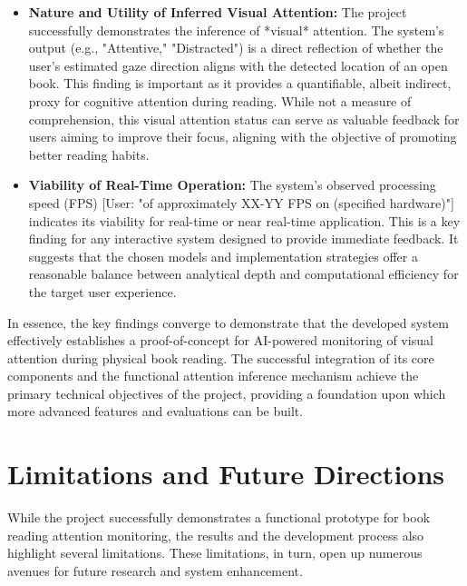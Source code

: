 \begin{itemize}
    \item \textbf{Nature and Utility of Inferred Visual Attention:}
    The project successfully demonstrates the inference of *visual* attention. The system's output (e.g., "Attentive," "Distracted") is a direct reflection of whether the user's estimated gaze direction aligns with the detected location of an open book. This finding is important as it provides a quantifiable, albeit indirect, proxy for cognitive attention during reading. While not a measure of comprehension, this visual attention status can serve as valuable feedback for users aiming to improve their focus, aligning with the objective of promoting better reading habits.

    \item \textbf{Viability of Real-Time Operation:}
    The system's observed processing speed (FPS) [User: "of approximately XX-YY FPS on (specified hardware)"] indicates its viability for real-time or near real-time application. This is a key finding for any interactive system designed to provide immediate feedback. It suggests that the chosen models and implementation strategies offer a reasonable balance between analytical depth and computational efficiency for the target user experience.
\end{itemize}
In essence, the key findings converge to demonstrate that the developed system effectively establishes a proof-of-concept for AI-powered monitoring of visual attention during physical book reading. The successful integration of its core components and the functional attention inference mechanism achieve the primary technical objectives of the project, providing a foundation upon which more advanced features and evaluations can be built.

\section{Limitations and Future Directions}
While the project successfully demonstrates a functional prototype for book reading attention monitoring, the results and the development process also highlight several limitations. These limitations, in turn, open up numerous avenues for future research and system enhancement.

